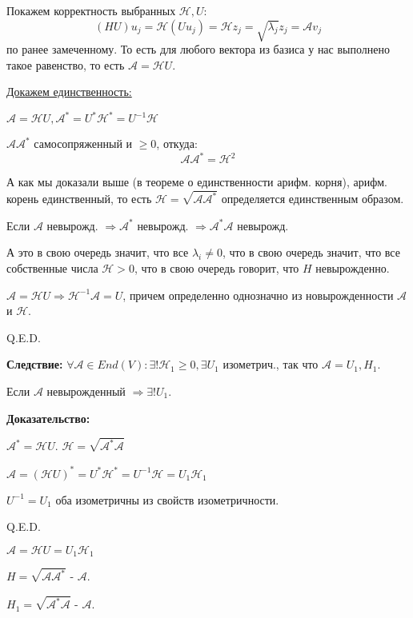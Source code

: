 Покажем корректность выбранных $\mathcal{H},U$:
$$(HU)u_j = \mathcal{H}(U u_j) = \mathcal{H}z_j =\sqrt{\lambda_j}z_j = \mathcal{A}v_j$$
по ранее замеченному. То есть для любого вектора из базиса у нас выполнено такое равенство, то есть $\mathcal{A} = \mathcal{H} U$.

\uline{Докажем единственность:} 

$\mathcal{A} = \mathcal{H} U, \mathcal{A}^* = U^* \mathcal{H}^* = U^{-1}\mathcal{H}$

$\mathcal{A}\mathcal{A}^*$ самосопряженный и $\geq 0$, откуда:
$$\mathcal{A}\mathcal{A}^* = \mathcal{H}^2 $$

А как мы доказали выше (в теореме о единственности арифм. корня), арифм. корень единственный, то есть $\mathcal{H} = \sqrt{\mathcal{A A}^*}$ определяется единственным образом.

Если $\mathcal{A}$ невырожд. $\Rightarrow \mathcal{A}^*$ невырожд. $\Rightarrow \mathcal{A}^* \mathcal{A}$ невырожд.

А это в свою очередь значит, что все $\lambda_i \neq 0$, что  в свою очередь значит, что все собственные числа $\mathcal{H} >0$, что в свою очередь говорит, что $H$ невырожденно.

$\mathcal{A} = \mathcal{H}U \Rightarrow \mathcal{H}^{-1}\mathcal{A} = U$, причем определенно однозначно из новырожденности $\mathcal{A}$ и $\mathcal{H}$.


\hfill Q.E.D.


\textbf{Следствие:} $\forall \mathcal{A}\in End(V): \exists! \mathcal{H}_1 \geq 0, \exists U_1$ изометрич., так что $\mathcal{A} = U_1,H_1$.

Если $\mathcal{A}$ невырожденный $\Rightarrow \exists! U_1$.

\textbf{Доказательство:}

$\mathcal{A}^* = \mathcal{H}U$. $\mathcal{H} = \sqrt{\mathcal{A}^*\mathcal{A}}$

$\mathcal{A} = (\mathcal{H}U)^* = U^* \mathcal{H}^* = U^{-1}\mathcal{H} = U_1\mathcal{H}_1$

$U^{-1} = U_1$ оба изометричны из свойств изометричности.

\hfill Q.E.D.

$\mathcal{A} = \mathcal{H} U = U_1 \mathcal{H}_1$

$H  =\sqrt{\mathcal{A}\mathcal{A}^*}$ -  $\mathcal{A}$.
 
$H_1  =\sqrt{\mathcal{A}^*\mathcal{A}}$ -  $\mathcal{A}$.



